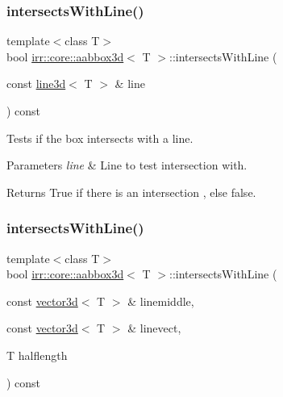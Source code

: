 \subsubsection{\texorpdfstring{intersects\+With\+Line()}{intersectsWithLine()}\hspace{0.1cm}{\footnotesize\ttfamily [1/2]}}
{\footnotesize\ttfamily template$<$class T$>$ \\
bool \hyperlink{classirr_1_1core_1_1aabbox3d}{irr\+::core\+::aabbox3d}$<$ T $>$\+::intersects\+With\+Line (\begin{DoxyParamCaption}\item[{const \hyperlink{classirr_1_1core_1_1line3d}{line3d}$<$ T $>$ \&}]{line }\end{DoxyParamCaption}) const\hspace{0.3cm}{\ttfamily [inline]}}



Tests if the box intersects with a line. 


\begin{DoxyParams}{Parameters}
{\em line} & Line to test intersection with. \\
\hline
\end{DoxyParams}
\begin{DoxyReturn}{Returns}
True if there is an intersection , else false. 
\end{DoxyReturn}
\mbox{\label{classirr_1_1core_1_1aabbox3d_ad24417ef24e598bc484ea8b7af1c2187}} 
\subsubsection{\texorpdfstring{intersects\+With\+Line()}{intersectsWithLine()}\hspace{0.1cm}{\footnotesize\ttfamily [2/2]}}
{\footnotesize\ttfamily template$<$class T$>$ \\
bool \hyperlink{classirr_1_1core_1_1aabbox3d}{irr\+::core\+::aabbox3d}$<$ T $>$\+::intersects\+With\+Line (\begin{DoxyParamCaption}\item[{const \hyperlink{classirr_1_1core_1_1vector3d}{vector3d}$<$ T $>$ \&}]{linemiddle,  }\item[{const \hyperlink{classirr_1_1core_1_1vector3d}{vector3d}$<$ T $>$ \&}]{linevect,  }\item[{T}]{halflength }\end{DoxyParamCaption}) const\hspace{0.3cm}{\ttfamily [inline]}}



